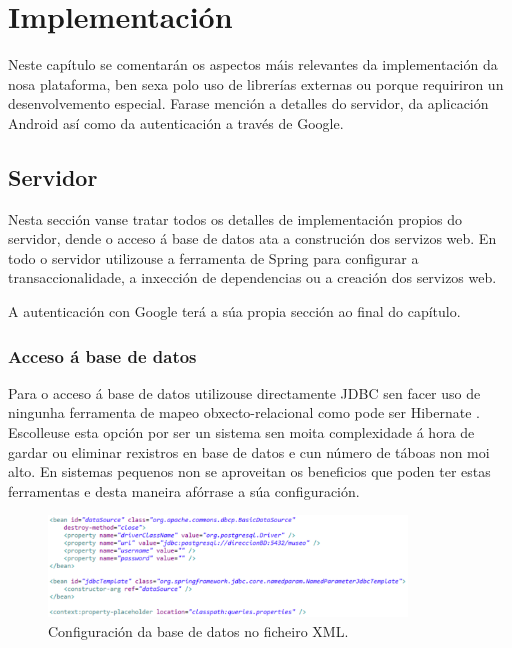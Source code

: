 \chapter{Implementación}

Neste capítulo se comentarán os aspectos máis relevantes da implementación da nosa plataforma, ben sexa polo uso de librerías externas ou porque requiriron un desenvolvemento especial. Farase mención a detalles do servidor, da aplicación Android así como da autenticación a través de Google.


\section{Servidor}
Nesta sección vanse tratar todos os detalles de implementación propios do servidor, dende o acceso á base de datos ata a construción dos servizos web. En todo o servidor utilizouse a ferramenta de Spring para configurar a transaccionalidade, a inxección de dependencias ou a creación dos servizos web.

A autenticación con Google terá a súa propia sección ao final do capítulo.


\subsection{Acceso á base de datos}
Para o acceso á base de datos utilizouse directamente JDBC sen facer uso de ningunha ferramenta de mapeo obxecto-relacional como pode ser Hibernate \cite{hibernate}. Escolleuse esta opción por ser un sistema sen moita complexidade á hora de gardar ou eliminar rexistros en base de datos e cun número de táboas non moi alto. En sistemas pequenos non se aproveitan os beneficios que poden ter estas ferramentas e desta maneira afórrase a súa configuración.

\begin{figure}[tbh] 
	\begin{center}
		\includegraphics[width=0.85\textwidth]{figures/codigo/configuracionBD}
		\caption{Configuración da base de datos no ficheiro XML.}
		\label{fig:configuracionBD}
	\end{center}
\end{figure}

